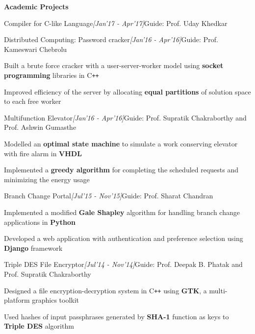 \documentclass[a4paper,10pt]{resume}%
\begin{document}
\begin{rSection}{{\textbf{Academic Projects}}}
\begin{rSubsection}{{Compiler for C-like Language}}{\sl \small[Jan'17 - Apr'17]}{Guide: Prof. Uday Khedkar}
\end{rSubsection}
\vspace{-2mm}
\begin{rSubsection}{{Distributed Computing: Password cracker}}{\sl \small[Jan'16 - Apr'16]}{Guide: Prof. Kameswari Chebrolu}
\vspace{-1.0mm}
\item Built a brute force cracker with a user-server-worker model using \textbf{socket programming} libraries in C\texttt{+}\texttt{+}
\item Improved efficiency of the server by allocating \textbf{equal partitions} of solution space to each free worker
\end{rSubsection}
\vspace{-2mm}
\begin{rSubsection}{{Multifunction Elevator}}{\sl \small[Jan'16 - Apr'16]}{Guide: Prof. Supratik Chakraborthy and Prof. Ashwin Gumasthe}
\vspace{-1.0mm}
\item Modelled an \textbf{optimal state machine} to simulate a work conserving elevator with fire alarm in \textbf{VHDL}
\item Implemented a \textbf{greedy algorithm} for completing the scheduled requests and minimizing the energy usage
\end{rSubsection}
\vspace{-2mm}
\begin{rSubsection}{{Branch Change Portal}}{\sl \small[Jul'15 - Nov'15]}{Guide: Prof. Sharat Chandran}
\vspace{-1.0mm}
\item Implemented a modified \textbf{Gale Shapley} algorithm for handling branch change applications in \textbf{Python}
\item Developed a web application with authentication and preference selection using \textbf{Django} framework
\end{rSubsection}
\vspace{-2mm}
\begin{rSubsection}{{Triple DES File Encryptor}}{\sl \small[Jul'14 - Nov'14]}{Guide: Prof. Deepak B. Phatak and Prof. Supratik Chakraborthy}
\vspace{-1.0mm}
\item Designed a file encryption-decryption system in C\texttt{+}\texttt{+} using \textbf{GTK}, a multi-platform graphics toolkit
\item Used hashes of input passphrases generated by \textbf{SHA-1} function as keys to \textbf{Triple DES} algorithm
\end{rSubsection}
\end{rSection}
\end{document}

